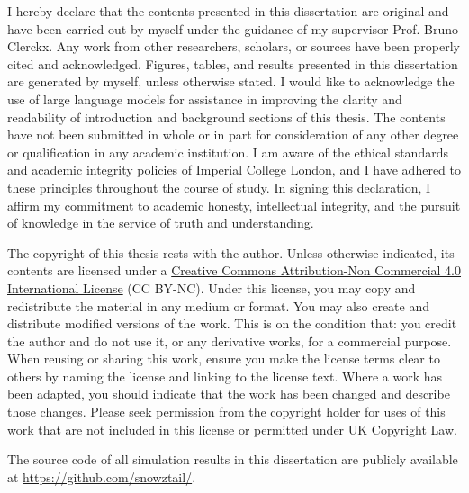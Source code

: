 
\begin{declaration}

I hereby declare that the contents presented in this dissertation are original and have been carried out by myself under the guidance of my supervisor Prof. Bruno Clerckx.
Any work from other researchers, scholars, or sources have been properly cited and acknowledged.
Figures, tables, and results presented in this dissertation are generated by myself, unless otherwise stated.
I would like to acknowledge the use of large language models for assistance in improving the clarity and readability of introduction and background sections of this thesis.
The contents have not been submitted in whole or in part for consideration of any other degree or qualification in any academic institution.
I am aware of the ethical standards and academic integrity policies of Imperial College London, and I have adhered to these principles throughout the course of study.
In signing this declaration, I affirm my commitment to academic honesty, intellectual integrity, and the pursuit of knowledge in the service of truth and understanding.

The copyright of this thesis rests with the author. Unless otherwise indicated, its contents are licensed under a \href{https://creativecommons.org/licenses/by-nc/4.0/deed.en}{Creative Commons Attribution-Non Commercial 4.0 International License} (CC BY-NC). Under this license, you may copy and redistribute the material in any medium or format. You may also create and distribute modified versions of the work. This is on the condition that: you credit the author and do not use it, or any derivative works, for a commercial purpose. When reusing or sharing this work, ensure you make the license terms clear to others by naming the license and linking to the license text. Where a work has been adapted, you should indicate that the work has been changed and describe those changes. Please seek permission from the copyright holder for uses of this work that are not included in this license or permitted under UK Copyright Law.

The source code of all simulation results in this dissertation are publicly available at \url{https://github.com/snowztail/}.

\end{declaration}
